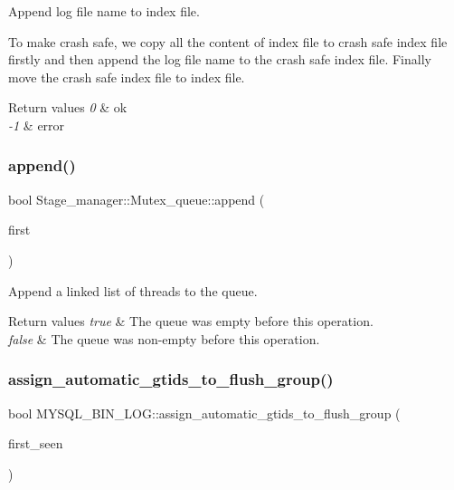 Append log file name to index file.


\begin{DoxyItemize}
\item To make crash safe, we copy all the content of index file to crash safe index file firstly and then append the log file name to the crash safe index file. Finally move the crash safe index file to index file.
\end{DoxyItemize}


\begin{DoxyRetVals}{Return values}
{\em 0} & ok \\
\hline
{\em -\/1} & error \\
\hline
\end{DoxyRetVals}
\mbox{\label{group__Binary__Log_ga20a543666e684f08da1cc093d5fa70ec}} 
\subsubsection{\texorpdfstring{append()}{append()}}
{\footnotesize\ttfamily bool Stage\+\_\+manager\+::\+Mutex\+\_\+queue\+::append (\begin{DoxyParamCaption}\item[{T\+HD $\ast$}]{first }\end{DoxyParamCaption})}

Append a linked list of threads to the queue. 
\begin{DoxyRetVals}{Return values}
{\em true} & The queue was empty before this operation. \\
\hline
{\em false} & The queue was non-\/empty before this operation. \\
\hline
\end{DoxyRetVals}
\mbox{\label{group__Binary__Log_gacface590afa692fc84446cde6f104231}} 
\subsubsection{\texorpdfstring{assign\+\_\+automatic\+\_\+gtids\+\_\+to\+\_\+flush\+\_\+group()}{assign\_automatic\_gtids\_to\_flush\_group()}}
{\footnotesize\ttfamily bool M\+Y\+S\+Q\+L\+\_\+\+B\+I\+N\+\_\+\+L\+O\+G\+::assign\+\_\+automatic\+\_\+gtids\+\_\+to\+\_\+flush\+\_\+group (\begin{DoxyParamCaption}\item[{T\+HD $\ast$}]{first\+\_\+seen }\end{DoxyParamCaption})}


